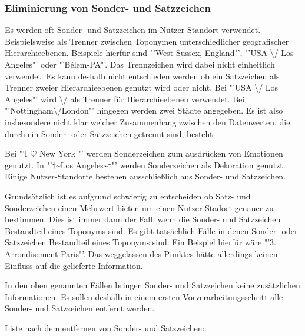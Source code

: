 			\subsubsection{Eliminierung von Sonder- und Satzzeichen} 

				Es werden oft Sonder- und Satzzeichen im Nutzer-Standort verwendet. 
				Beispielsweise als Trenner zwischen Toponymen unterschiedlicher geografischer Hierarchieebenen.
				Beispiele hierfür sind "'West Sussex, England"', "'USA \textbackslash/ Los Angeles"' oder "'Bélem-PA"'.
				Das Trennzeichen wird dabei nicht einheitlich verwendet.  
				Es kann deshalb nicht entschieden werden ob ein Satzzeichen als Trenner zweier Hierarchieebenen genutzt wird oder nicht.
				Bei "'USA \textbackslash/ Los Angeles"' wird \textbackslash/ als Trenner für Hierarchieebenen verwendet.
				Bei "'Nottingham\textbackslash/London"' hingegen werden zwei Städte angegeben.
				Es ist also insbesondere nicht klar welcher Zusammenhang zwischen den Datenwerten, die durch ein Sonder- oder Satzzeichen getrennt sind, besteht. 

				Bei "'I $\heartsuit$ New York "' werden Sonderzeichen zum ausdrücken von Emotionen genutzt.
				In "'$\dagger$\textasciitilde Los Angeles\textasciitilde$\dagger$"' werden Sonderzeichen als Dekoration genutzt.
				Einige Nutzer-Standorte bestehen ausschließlich aus Sonder- und Satzzeichen.
				
				Grundsätzlich ist es aufgrund schwierig zu entscheiden ob Satz- und Sonderzeichen einen Mehrwert bieten um einen Nutzer-Stadort genauer zu bestimmen.
				Dies ist immer dann der Fall, wenn die Sonder- und Satzzeichen Bestandteil eines Toponyms sind. 
				Es gibt tatsächlich Fälle in denen Sonder- oder Satzzeichen Bestandteil eines Toponyms sind.
				Ein Beispiel hierfür wäre "'3. Arrondisement Paris"'.
				Das weggelassen des Punktes hätte allerdings keinen Einfluss auf die gelieferte Information.

				In den oben genannten Fällen bringen Sonder- und Satzzeichen keine zusätzlichen Informationen.
				Es sollen deshalb in einem ersten Vorverarbeitungsschritt alle Sonder- und Satzzeichen entfernt werden. 

				Liste nach dem entfernen von Sonder- und Satzzeichen:

